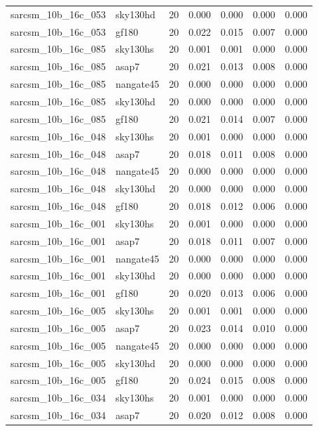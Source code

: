 \begin{tabular}{llrrrrr}
sarcsm\_10b\_16c\_053 & sky130hd & 20 & 0.000 & 0.000 & 0.000 & 0.000 \\
sarcsm\_10b\_16c\_053 & gf180 & 20 & 0.022 & 0.015 & 0.007 & 0.000 \\
sarcsm\_10b\_16c\_085 & sky130hs & 20 & 0.001 & 0.001 & 0.000 & 0.000 \\
sarcsm\_10b\_16c\_085 & asap7 & 20 & 0.021 & 0.013 & 0.008 & 0.000 \\
sarcsm\_10b\_16c\_085 & nangate45 & 20 & 0.000 & 0.000 & 0.000 & 0.000 \\
sarcsm\_10b\_16c\_085 & sky130hd & 20 & 0.000 & 0.000 & 0.000 & 0.000 \\
sarcsm\_10b\_16c\_085 & gf180 & 20 & 0.021 & 0.014 & 0.007 & 0.000 \\
sarcsm\_10b\_16c\_048 & sky130hs & 20 & 0.001 & 0.000 & 0.000 & 0.000 \\
sarcsm\_10b\_16c\_048 & asap7 & 20 & 0.018 & 0.011 & 0.008 & 0.000 \\
sarcsm\_10b\_16c\_048 & nangate45 & 20 & 0.000 & 0.000 & 0.000 & 0.000 \\
sarcsm\_10b\_16c\_048 & sky130hd & 20 & 0.000 & 0.000 & 0.000 & 0.000 \\
sarcsm\_10b\_16c\_048 & gf180 & 20 & 0.018 & 0.012 & 0.006 & 0.000 \\
sarcsm\_10b\_16c\_001 & sky130hs & 20 & 0.001 & 0.000 & 0.000 & 0.000 \\
sarcsm\_10b\_16c\_001 & asap7 & 20 & 0.018 & 0.011 & 0.007 & 0.000 \\
sarcsm\_10b\_16c\_001 & nangate45 & 20 & 0.000 & 0.000 & 0.000 & 0.000 \\
sarcsm\_10b\_16c\_001 & sky130hd & 20 & 0.000 & 0.000 & 0.000 & 0.000 \\
sarcsm\_10b\_16c\_001 & gf180 & 20 & 0.020 & 0.013 & 0.006 & 0.000 \\
sarcsm\_10b\_16c\_005 & sky130hs & 20 & 0.001 & 0.001 & 0.000 & 0.000 \\
sarcsm\_10b\_16c\_005 & asap7 & 20 & 0.023 & 0.014 & 0.010 & 0.000 \\
sarcsm\_10b\_16c\_005 & nangate45 & 20 & 0.000 & 0.000 & 0.000 & 0.000 \\
sarcsm\_10b\_16c\_005 & sky130hd & 20 & 0.000 & 0.000 & 0.000 & 0.000 \\
sarcsm\_10b\_16c\_005 & gf180 & 20 & 0.024 & 0.015 & 0.008 & 0.000 \\
sarcsm\_10b\_16c\_034 & sky130hs & 20 & 0.001 & 0.000 & 0.000 & 0.000 \\
sarcsm\_10b\_16c\_034 & asap7 & 20 & 0.020 & 0.012 & 0.008 & 0.000 \\

\end{tabular}
